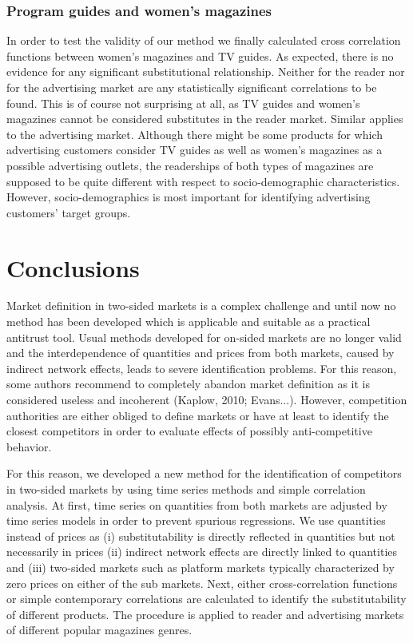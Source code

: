 \documentclass[12pt,a4paper,notitlepage]{article}
\begin{document}
\subsubsection{Program guides and women's magazines }

In order to test the validity of our method we finally calculated cross correlation functions between women's magazines and TV guides. As expected, there is no evidence for any significant substitutional relationship. Neither for the reader nor for the advertising market are any statistically significant correlations to be found. This is of course not surprising at all, as TV guides and women's magazines cannot be considered substitutes in the reader market. Similar applies to the advertising market. Although there might be some products for which advertising customers consider TV guides as well as women's magazines as a possible advertising outlets, the readerships of both types of magazines are supposed to be quite different with respect to socio-demographic characteristics. However, socio-demographics is most important for identifying advertising customers' target groups. 

\section{Conclusions}

Market definition in two-sided markets is a complex challenge and until now no method has been developed which is applicable and suitable as a practical  antitrust tool. Usual methods developed for on-sided markets are no longer valid and the interdependence of quantities and prices from both markets, caused by indirect network effects, leads to severe identification problems. For this reason, some authors recommend to completely abandon market definition as it is considered useless and incoherent (Kaplow, 2010; Evans...). However, competition authorities are either obliged to define markets or have at least to identify the closest competitors in order to evaluate effects of possibly anti-competitive behavior.   

For this reason, we developed a new method for the identification of competitors in two-sided markets by using time series methods and simple correlation analysis. At first, time series on quantities from both markets are adjusted by time series models in order to prevent spurious regressions. We use quantities instead of prices as (i) substitutability is directly reflected in quantities but not necessarily in prices (ii) indirect network effects are directly linked to quantities  and (iii) two-sided markets such as platform markets typically characterized by zero prices on either of the sub markets. Next, either cross-correlation functions or simple contemporary correlations are calculated to identify the substitutability of different products. The procedure is applied to reader and advertising markets of different popular magazines genres. 
\end{document}
